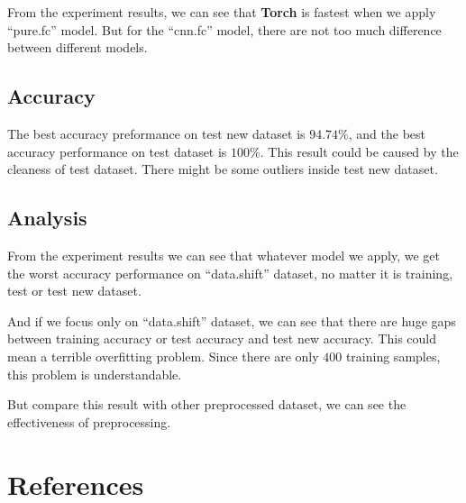 \documentclass[a4paper]{article}
\begin{document}
From the experiment results, we can see that \textbf{Torch} is fastest when we apply ``pure.fc'' model. But for the ``cnn.fc'' model, there are not too much difference between different models.

\subsection{Accuracy}

The best accuracy preformance on test new dataset is $94.74\%$, and the best accuracy performance on test dataset is $100\%$. This result could be caused by the cleaness of test dataset. There might be some outliers inside test new dataset.

\subsection{Analysis}

From the experiment results we can see that whatever model we apply, we get the worst accuracy performance on ``data.shift'' dataset, no matter it is training, test or test new dataset.

And if we focus only on ``data.shift'' dataset, we can see that there are huge gaps between training accuracy or test accuracy and test new accuracy. This could mean a terrible overfitting problem. Since there are only $400$ training samples, this problem is understandable.

But compare this result with other preprocessed dataset, we can see the effectiveness of preprocessing.

\section{References}



\end{document}
